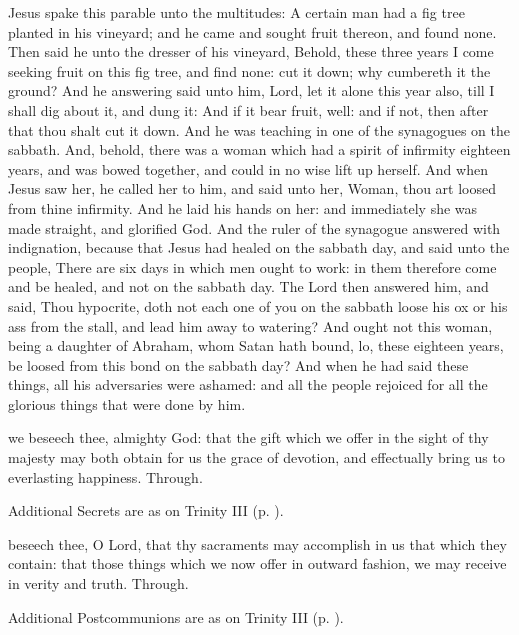  Jesus spake this parable unto the multitudes: A certain man had a fig tree planted in his vineyard; and he came and sought fruit thereon, and found none. Then said he unto the dresser of his vineyard, Behold, these three years I come seeking fruit on this fig tree, and find none: cut it down; why cumbereth it the ground? And he answering said unto him, Lord, let it alone this year also, till I shall dig about it, and dung it: And if it bear fruit, well: and if not, then after that thou shalt cut it down. And he was teaching in one of the synagogues on the sabbath. And, behold, there was a woman which had a spirit of infirmity eighteen years, and was bowed together, and could in no wise lift up herself. And when Jesus saw her, he called her to him, and said unto her, Woman, thou art loosed from thine infirmity. And he laid his hands on her: and immediately she was made straight, and glorified God. And the ruler of the synagogue answered with indignation, because that Jesus had healed on the sabbath day, and said unto the people, There are six days in which men ought to work: in them therefore come and be healed, and not on the sabbath day. The Lord then answered him, and said, Thou hypocrite, doth not each one of you on the sabbath loose his ox or his ass from the stall, and lead him away to watering? And ought not this woman, being a daughter of Abraham, whom Satan hath bound, lo, these eighteen years, be loosed from this bond on the sabbath day? And when he had said these things, all his adversaries were ashamed: and all the people rejoiced for all the glorious things that were done by him.

\vspace{-1.5ex}

\secret
{} we beseech thee, almighty God: that the gift which we offer in the sight of thy majesty may both obtain for us the grace of devotion, and effectually bring us to everlasting happiness. Through.
\begin{rubric}
    Additional Secrets are as on Trinity III (p. \pageref{TrinityIIISecret}).
\end{rubric}

\vspace{-1ex}

\postcommunion
{} beseech thee, O Lord, that thy sacraments may accomplish in us that which they contain: that those things which we now offer in outward fashion, we may receive in verity and truth. Through.
\begin{rubric}
    Additional Postcommunions are as on Trinity III (p. \pageref{TrinityIIIPostcommunion}).
\end{rubric}


